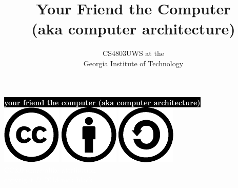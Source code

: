 \documentclass[mathserif,xcolor={dvipsnames,table}]{beamer}
\title{\textbf{Your Friend the Computer \\(aka computer architecture)}}
\date{}
\author{CS4803UWS at the\\
Georgia Institute of Technology
}
\begin{document}
{
%
\begin{frame}[plain]
\textcolor{white}{
%
\colorbox{black}{\textbf{your friend the computer (aka computer architecture)}}
}
\vspace{2.7in}
\\
\hfill\includegraphics[scale=.25]{images/cc-logo.pdf}
\includegraphics[scale=.25]{images/cc-new.pdf}
\includegraphics[scale=.25]{images/cc-share.pdf}
\textcolor{white}{
\\
\hfill \tiny{CC3.0 share-alike attribution}\\
}
\textcolor{white}{
\hfill \scriptsize{copyright \copyright\ 2013 nick black}\\
}
\end{frame}
}
\end{document}
